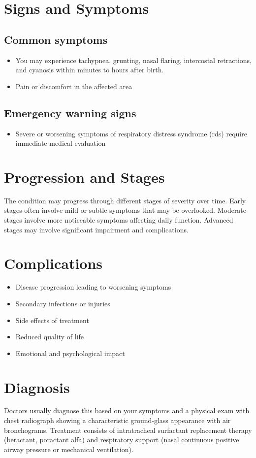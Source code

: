 \section{Signs and Symptoms}
\subsection{Common symptoms}
\begin{itemize}[noitemsep]
  \item You may experience tachypnea, grunting, nasal flaring, intercostal retractions, and cyanosis within minutes to hours after birth.
  \item Pain or discomfort in the affected area
  \end{itemize}
\subsection{Emergency warning signs}
\begin{itemize}[noitemsep]
  \item Severe or worsening symptoms of respiratory distress syndrome (rds) require immediate medical evaluation
\end{itemize}
\section{Progression and Stages}
The condition may progress through different stages of severity over time. Early stages often involve mild or subtle symptoms that may be overlooked. Moderate stages involve more noticeable symptoms affecting daily function. Advanced stages may involve significant impairment and complications.
\section{Complications}
\begin{itemize}[noitemsep]
  \item Disease progression leading to worsening symptoms
  \item Secondary infections or injuries
  \item Side effects of treatment
  \item Reduced quality of life
  \item Emotional and psychological impact
\end{itemize}
\section{Diagnosis}
Doctors usually diagnose this based on your symptoms and a physical exam with chest radiograph showing a characteristic ground-glass appearance with air bronchograms. Treatment consists of intratracheal surfactant replacement therapy (beractant, poractant alfa) and respiratory support (nasal continuous positive airway pressure or mechanical ventilation).

